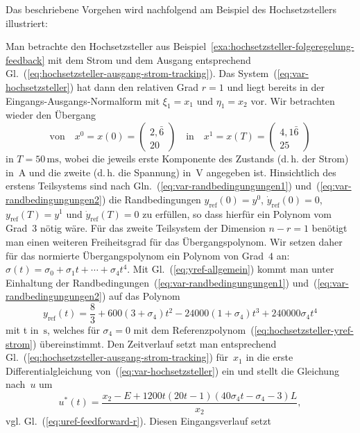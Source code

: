 Das beschriebene Vorgehen wird nachfolgend am Beispiel des Hochsetzstellers
illustriert:
\begin{example}
Man betrachte den Hochsetzsteller aus Beispiel~\ref{exa:hochsetzsteller-folgeregelung-feedback}
mit dem Strom und dem Ausgang entsprechend Gl.~(\ref{eq:hochsetzsteller-ausgang-strom-tracking}).
Das System~(\ref{eq:var-hochsetzsteller}) hat dann den relativen
Grad $r=1$ und liegt bereits in der Eingangs-Ausgangs-Normalform
mit $\xi_{1}=x_{1}$ und $\eta_{1}=x_{2}$ vor. Wir betrachten wieder
den Übergang 
\[
\text{von}\quad x^{0}=x(0)=\left(\begin{array}{c}
2,\bar{6}\\
20
\end{array}\right)\quad\text{in}\quad x^{1}=x(T)=\left(\begin{array}{c}
4,1\bar{6}\\
25
\end{array}\right)
\]
in $T=50\,\text{ms}$, wobei die jeweils erste Komponente des Zustands
(d.\,h. der Strom) in~$\text{A}$ und die zweite (d.\,h. die Spannung)
in~$\text{V}$ angegeben ist. Hinsichtlich des erstens Teilsystems
sind nach Gln.~(\ref{eq:var-randbedingungungen1}) und~(\ref{eq:var-randbedingungungen2})
die Randbedingungen $y_{\text{ref}}(0)=y^{0}$, $\dot{y}_{\text{ref}}(0)=0$,
$y_{\text{ref}}(T)=y^{1}$ und $\dot{y}_{\text{ref}}(T)=0$ zu erfüllen,
so dass hierfür ein Polynom vom Grad~$3$ nötig wäre. Für das zweite
Teilsystem der Dimension $n-r=1$ benötigt man einen weiteren Freiheitsgrad
für das Übergangspolynom. Wir setzen daher für das normierte Übergangspolynom
ein Polynom von Grad~$4$ an: $\sigma(t)=\sigma_{0}+\sigma_{1}t+\cdots+\sigma_{4}t^{4}$.
Mit Gl.~(\ref{eq:yref-allgemein}) kommt man unter Einhaltung der
Randbedingungen~(\ref{eq:var-randbedingungungen1}) und~(\ref{eq:var-randbedingungungen2})
auf das Polynom 
\begin{equation}
y_{\text{ref}}(t)=\frac{8}{3}+600(3+\sigma_{4})t^{2}-24000(1+\sigma_{4})t^{3}+240000\sigma_{4}t^{4}\label{eq:hochsetzsteller-yref-strom-FF}
\end{equation}
mit t in~$\text{s}$, welches für $\sigma_{4}=0$ mit dem Referenzpolynom~(\ref{eq:hochsetzsteller-yref-strom})
übereinstimmt. Den Zeitverlauf setzt man entsprechend Gl.~(\ref{eq:hochsetzsteller-ausgang-strom-tracking})
für~$x_{1}$ in die erste Differentialgleichung von~(\ref{eq:var-hochsetzsteller})
ein und stellt die Gleichung nach~$u$ um
\[
u^{*}(t)=\frac{x_{2}-E+1200t(20t-1)(40\sigma_{4}t-\sigma_{4}-3)L}{x_{2}},
\]
vgl. Gl.~(\ref{eq:uref-feedforward-r}). Diesen Eingangsverlauf setzt

\end{example}
